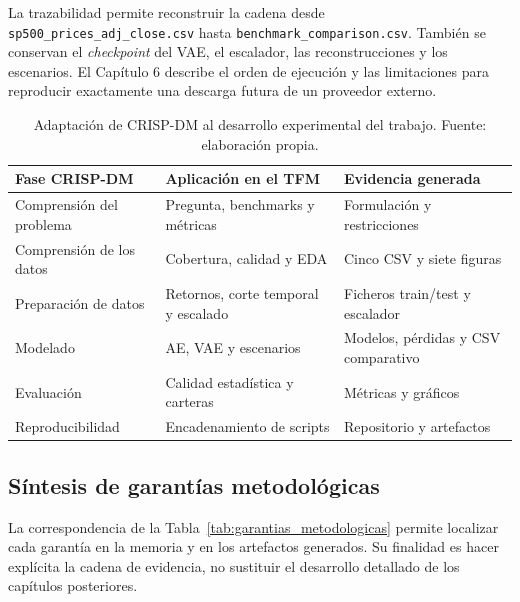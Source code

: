 La trazabilidad permite reconstruir la cadena desde \texttt{sp500\_prices\_adj\_close.csv} hasta \texttt{benchmark\_comparison.csv}. También se conservan el \textit{checkpoint} del VAE, el escalador, las reconstrucciones y los escenarios. El Capítulo 6 describe el orden de ejecución y las limitaciones para reproducir exactamente una descarga futura de un proveedor externo.

\begin{table}[htbp]
\centering
\small
\begin{tabular}{p{}p{}p{}}
\toprule
Fase CRISP-DM & Aplicación en el TFM & Evidencia generada \\
\midrule
Comprensión del problema & Pregunta, benchmarks y métricas & Formulación y restricciones \\
Comprensión de los datos & Cobertura, calidad y EDA & Cinco CSV y siete figuras \\
Preparación de datos & Retornos, corte temporal y escalado & Ficheros train/test y escalador \\
Modelado & AE, VAE y escenarios & Modelos, pérdidas y CSV comparativo \\
Evaluación & Calidad estadística y carteras & Métricas y gráficos \\
Reproducibilidad & Encadenamiento de scripts & Repositorio y artefactos \\
\bottomrule
\end{tabular}
\caption{Adaptación de CRISP-DM al desarrollo experimental del trabajo. Fuente: elaboración propia.}
\label{tab:crisp_dm_tfm}
\end{table}

\subsection{Síntesis de garantías metodológicas}

La correspondencia de la Tabla~\ref{tab:garantias_metodologicas} permite localizar cada garantía en la memoria y en los artefactos generados. Su finalidad es hacer explícita la cadena de evidencia, no sustituir el desarrollo detallado de los capítulos posteriores.

